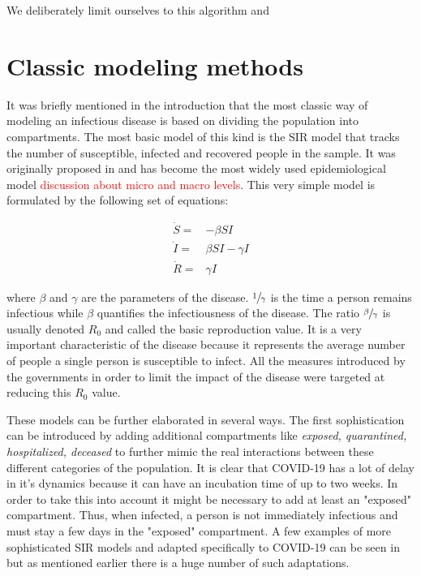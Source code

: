 \documentclass[12pt, letterpaper]{article}
\newcommand{\com}[1] {{\small {\fontfamily{ptm} \selectfont \textcolor{red}{#1}}}}
\begin{document}
We deliberately limit ourselves to this algorithm and 

\section{Classic modeling methods}\label{sec:class}

It was briefly mentioned in the introduction that the most classic way of modeling an infectious disease is based on dividing the population into compartments. The most basic model of this kind is the SIR model that tracks the number of susceptible, infected and recovered people in the sample. It was originally proposed in \cite{sir} and has become the most widely used epidemiological model \com{discussion about micro and macro levels}. This very simple model is formulated by the following set of equations:

\begin{align*}
\dot{S} = &- \beta SI \\
\dot{I} = &\beta SI - \gamma I \\
\dot{R} = & \gamma I
\end{align*}

where $\beta$ and $\gamma$ are the parameters of the disease. $\sfrac{1}{\gamma}$ is the time a person remains infectious while $\beta$ quantifies the infectiousness of the disease. The ratio $\sfrac{\beta}{\gamma}$ is usually denoted $R_0$ and called the basic reproduction value. It is a very important characteristic of the disease because it represents the average number of people a single person is susceptible to infect. All the measures introduced by the governments in order to limit the impact of the disease were targeted at reducing this $R_0$ value. 

These models can be further elaborated in several ways. The first sophistication can be introduced by adding additional compartments like {\em exposed, quarantined, hospitalized, deceased} to further mimic the real interactions between these different categories of the population. It is clear that COVID-19 has a lot of delay in it's dynamics \cite{delay} because it can have an incubation time of up to two weeks. 
In order to take this into account it might be necessary to add at least an "exposed" compartment. Thus, when infected, a person is not immediately infectious and must stay a few days in the "exposed" compartment. 
A few examples of more sophisticated SIR models and adapted specifically to COVID-19 can be seen in \cite{seir} but as mentioned earlier there is a huge number of such adaptations.
\end{document}
